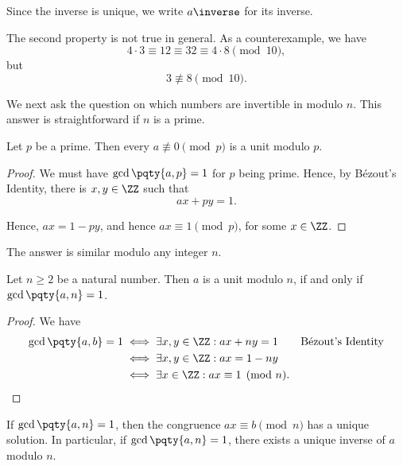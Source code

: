 \begin{notation}
    Since the inverse is unique, we write \(a\inverse\) for its inverse.
\end{notation}

\begin{remark}
    The second property is not true in general. As a counterexample, we have
    \[
        4 \cdot 3 \equiv 12 \equiv 32 \equiv 4 \cdot 8 \pmod{10},
    \]
    but
    \[
        3 \nequiv 8 \pmod{10}.
    \]
\end{remark}

We next ask the question on which numbers are invertible in modulo \(n\). This answer is straightforward if \(n\) is a prime.

\begin{proposition}
    Let \(p\) be a prime. Then every \(a \nequiv 0 \pmod{p}\) is a unit modulo \(p\).
\end{proposition}

\begin{proof}
    We must have \(\gcd\pqty{a, p} = 1\) for \(p\) being prime. Hence, by B\'{e}zout's Identity, there is \(x, y \in \ZZ\) such that
    \[
        ax + py = 1.
    \]
    
    Hence, \(ax = 1 - py\), and hence \(ax \equiv 1 \pmod{p}\), for some \(x \in \ZZ\).
\end{proof}

The answer is similar modulo any integer \(n\).

\begin{proposition}
    Let \(n \geq 2\) be a natural number. Then \(a\) is a unit modulo \(n\), if and only if \(\gcd\pqty{a, n} = 1\).
\end{proposition}

\begin{proof}
    We have
    \begin{align*}
        \gcd\pqty{a, b} = 1 &\iff \exists x, y \in \ZZ: ax + ny = 1 && \text{B\'{e}zout's Identity} \\
        &\iff \exists x, y \in \ZZ: ax = 1 - ny \\
        &\iff \exists x \in \ZZ: ax \equiv 1 \pmod{n}.
    \end{align*}
\end{proof}

\begin{corollary}
    If \(\gcd\pqty{a, n} = 1\), then the congruence \(ax \equiv b \pmod{n}\) has a unique solution. In particular, if \(\gcd\pqty{a, n} = 1\), there exists a unique inverse of \(a\) modulo \(n\).
\end{corollary}

